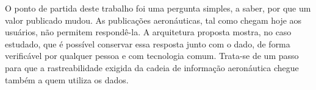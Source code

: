 O ponto de partida deste trabalho foi uma pergunta simples, a saber, por que um valor publicado mudou. As publicações aeronáuticas, tal como chegam hoje aos usuários, não permitem respondê-la. A arquitetura proposta mostra, no caso estudado, que é possível conservar essa resposta junto com o dado, de forma verificável por qualquer pessoa e com tecnologia comum. Trata-se de um passo para que a rastreabilidade exigida da cadeia de informação aeronáutica chegue também a quem utiliza os dados.